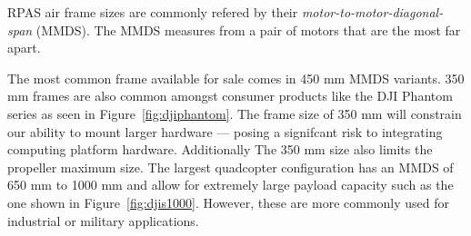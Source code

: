 RPAS air frame sizes are commonly refered by their \textit{motor-to-motor-diagonal-span} (MMDS). The MMDS measures from a pair of motors that are the most far apart. 

The most common frame available for sale comes in 450 mm MMDS variants. 350 mm frames are also common amongst consumer products like the DJI Phantom series\cite{dji-phantom-3-specs} as seen in Figure~\ref{fig:djiphantom}. The frame size of 350 mm will constrain our ability to mount larger hardware --- posing a signifcant risk to integrating computing platform hardware. Additionally The 350 mm size also limits the propeller maximum size. The largest quadcopter configuration has an MMDS of 650 mm to 1000 mm and allow for extremely large payload capacity such as the one shown in Figure~\ref{fig:djis1000}. However, these are more commonly used for industrial or military applications.

